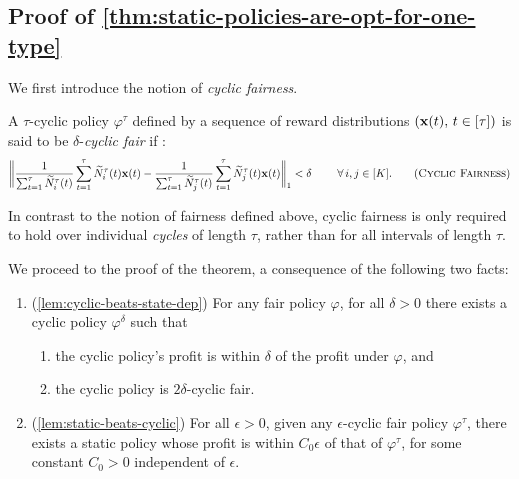 \documentclass[12pt]{article}
\begin{document}
\subsection{Proof of \cref{thm:static-policies-are-opt-for-one-type}}\label{apx:fairness-thm}

{We first introduce the notion of {\it cyclic fairness}.

\begin{definition}
A $\tau$-cyclic policy $\varphi^\tau$ defined by a sequence of reward distributions $(\mathbf{x}(t), \, t \in [\tau])$ is said to be $\delta$-\emph{cyclic fair} if :
\begin{align}\label{eq:cyclic-fair}
    \bigg{\lVert}\frac{1}{\sum_{t=1}^{\tau}\widetilde{N}^\tau_i(t)}\sum_{t=1}^{\tau} \widetilde{N}^\tau_i(t)\bx(t) - \frac{1}{\sum_{t=1}^{\tau}\widetilde{N}^\tau_j(t)}\sum_{t=1}^{\tau} \widetilde{N}^\tau_j(t)\bx(t) \bigg{\rVert}_1 < \delta  \qquad \, \, \forall \, i,j \in [K]. \tag{\textsc{Cyclic Fairness}}
\end{align}
\end{definition}


In contrast to the notion of fairness defined above, cyclic fairness is only required to hold over individual {\it cycles} of length $\tau$, rather than for all intervals of length $\tau$. 
}


We proceed to the proof of the theorem, a consequence of the following two facts:
\begin{enumerate}
    \item (\cref{lem:cyclic-beats-state-dep}) For any fair policy $\varphi$, for all $\delta > 0$ there exists a cyclic policy $\varphi^\delta$ such that
    \begin{enumerate}
    \item the cyclic policy's profit is within $\delta$ of the profit under $\varphi$, and
    \item the cyclic policy is $2\delta$-cyclic fair.
    \end{enumerate}
    \item (\cref{lem:static-beats-cyclic}) For all $\epsilon > 0$, given any $\epsilon$-cyclic fair policy $\varphi^\tau$, there exists a static policy whose profit is within $C_0\epsilon$ of that of $\varphi^\tau$, for some constant $C_0 > 0$ independent of $\epsilon$.
\end{enumerate}
\end{document}
